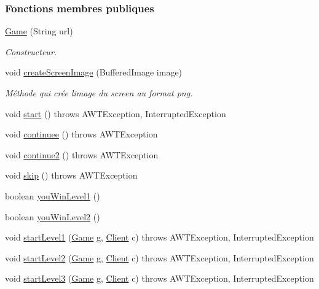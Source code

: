 \subsubsection*{Fonctions membres publiques}
\begin{DoxyCompactItemize}
\item 
\hyperlink{classTestSushi_1_1src_1_1Suchi_1_1Game_a080b679d900a5355a58c87aa0e2be12a}{Game} (String url)
\begin{DoxyCompactList}\small\item\em Constructeur. \end{DoxyCompactList}\item 
void \hyperlink{classTestSushi_1_1src_1_1Suchi_1_1Game_a63c142c6be839eff06e2381962b43422}{create\+Screen\+Image} (Buffered\+Image image)
\begin{DoxyCompactList}\small\item\em Méthode qui crée l\textquotesingle{}image du screen au format png. \end{DoxyCompactList}\item 
void \hyperlink{classTestSushi_1_1src_1_1Suchi_1_1Game_a9083c7e4bb330ebd05de1ad90d0de345}{start} ()  throws A\+W\+T\+Exception, Interrupted\+Exception
\item 
void \hyperlink{classTestSushi_1_1src_1_1Suchi_1_1Game_a136917318745e2966eec3c102ef20f57}{continuee} ()  throws A\+W\+T\+Exception
\item 
void \hyperlink{classTestSushi_1_1src_1_1Suchi_1_1Game_a37b17625141098299b4c606bbde99664}{continue2} ()  throws A\+W\+T\+Exception
\item 
void \hyperlink{classTestSushi_1_1src_1_1Suchi_1_1Game_acfa2b3e1a2afb508fd9f5a2ea48880d4}{skip} ()  throws A\+W\+T\+Exception
\item 
boolean \hyperlink{classTestSushi_1_1src_1_1Suchi_1_1Game_a627e7f357a85a65408869c4928f0aaba}{you\+Win\+Level1} ()
\item 
boolean \hyperlink{classTestSushi_1_1src_1_1Suchi_1_1Game_a23b63ff8a5456156d556549f32c0ef5a}{you\+Win\+Level2} ()
\item 
void \hyperlink{classTestSushi_1_1src_1_1Suchi_1_1Game_afab54e5fed238f38957b72a6aa5364ff}{start\+Level1} (\hyperlink{classTestSushi_1_1src_1_1Suchi_1_1Game}{Game} g, \hyperlink{classTestSushi_1_1src_1_1Suchi_1_1Client}{Client} c)  throws A\+W\+T\+Exception, Interrupted\+Exception
\item 
void \hyperlink{classTestSushi_1_1src_1_1Suchi_1_1Game_a815c21a7f2cb47ebbcd9b400cebd16ae}{start\+Level2} (\hyperlink{classTestSushi_1_1src_1_1Suchi_1_1Game}{Game} g, \hyperlink{classTestSushi_1_1src_1_1Suchi_1_1Client}{Client} c)  throws A\+W\+T\+Exception, Interrupted\+Exception
\item 
void \hyperlink{classTestSushi_1_1src_1_1Suchi_1_1Game_a5e6bfc9bc7b59378669a811697bce2ca}{start\+Level3} (\hyperlink{classTestSushi_1_1src_1_1Suchi_1_1Game}{Game} g, \hyperlink{classTestSushi_1_1src_1_1Suchi_1_1Client}{Client} c)  throws A\+W\+T\+Exception, Interrupted\+Exception
\end{DoxyCompactItemize}
